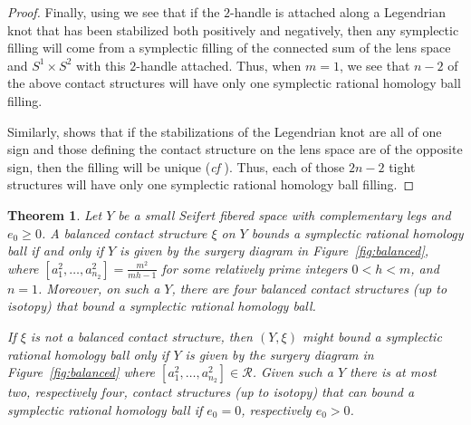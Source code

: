 \documentclass[11pt]{amsart}
\theoremstyle{plain}
\newtheorem{theorem}{Theorem}
\theoremstyle{definition}
\theoremstyle{remark}
\numberwithin{theorem}{section}
\begin{document}
\begin{proof}
Finally, using \cite[Theorem~1.4]{ChristianMenke19pre} we see that if the $2$-handle is attached along a Legendrian knot that has been stabilized both positively and negatively, then any symplectic filling will come from a symplectic filling of the connected sum of the lens space and $S^1\times S^2$ with this $2$-handle attached. Thus, when $m=1$, we see that $n-2$ of the above contact structures will have only one symplectic rational homology ball filling. 

Similarly, \cite[Theorem~1.4]{ChristianMenke19pre} shows that if the stabilizations of the Legendrian knot are all of one sign and those defining the contact structure on the lens space are of the opposite sign, then the filling will be unique ({\em cf } \cite[Theorem~3.1]{EtnyreRoy21}). Thus, each of those $2n-2$ tight structures will have only one symplectic rational homology ball filling. 
\end{proof}

\begin{theorem}\label{maine0+} 
Let $Y$ be a small Seifert fibered space with complementary legs and $e_0\geq 0$. A balanced contact structure $\xi$ on $Y$  bounds a symplectic rational homology ball if and only if $Y$ is given by the surgery diagram in Figure~\ref{fig:balanced},  where $[a^2_1,\ldots, a^2_{n_2}]=\frac {m^2}{mh-1}$ for some relatively prime integers $0<h<m$, and $n=1$.  Moreover, on such a $Y$, there are four balanced contact structures (up to isotopy) that bound a symplectic rational homology ball. 


If $\xi$ is not a balanced contact structure, then $(Y, \xi)$ might bound a symplectic rational homology ball only if $Y$ is given by the surgery diagram in Figure~\ref{fig:balanced} where $[a^2_1,\ldots, a^2_{n_2}]\in \mathcal{R}$. Given such a $Y$ there is at most two, respectively four, contact structures (up to isotopy) that can bound a symplectic rational homology ball if $e_0=0$, respectively $e_0>0$. 
\end{theorem}
\end{document}
